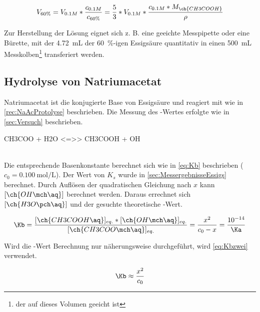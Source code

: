 \documentclass{article}
\begin{document}
         \begin{equation}
           V_{60\%} = V_{0.1 M} * \frac{c_{0.1 M}}{c_{60\%}} = \frac{5}{3} * V_{0.1 M} * \frac{c_{0.1 M} * M_{\ch{CH3COOH}}}{\rho} \label{eq:Volumen}
         \end{equation}
       
         Zur Herstellung der Lösung eignet sich z. B. eine geeichte Messpipette oder eine Bürette, mit der \SI[mode=text]{4.72}{\milli\liter} der \SI[mode=text]{60}{\percent}-igen Essigsäure quantitativ in einen \SI[mode=text]{500}{\milli\liter} Messkolben\footnote{der auf dieses Volumen geeicht ist} transferiert werden.
          
    \pagebreak
    
    \subsection{Hydrolyse von Natriumacetat} \label{sec:HydrolyseNatrium}
     
       Natriumacetat ist die konjugierte Base von Essigsäure und reagiert mit  wie in \ref{rec:NaAcProtolyse} beschrieben. Die Messung des \pH-Wertes erfolgte wie in \ref{sec:Versuch} beschrieben.
       
       \begin{reaction}
         CH3COO\mch\aq{} + H2O <=>> CH3COOH\aq{} + OH\mch\aq \label{rec:NaAcProtolyse} \\
       \end{reaction} \\
       
       Die entsprechende Basenkonstante \Kb berechnet sich wie in \eqref{eq:Kb} beschrieben ($c_{0} = \SI[mode=text]{0.100}{\mole\per\liter}$). Der Wert von $K_{s}$ wurde in \ref{sec:MessergebnisseEssigs} berechnet. Durch Auflösen der quadratischen Gleichung nach $x$ kann $[\ch{OH\mch\aq}]$ berechnet werden. Daraus errechnet sich $[\ch{H3O\pch\aq}]$ und der gesuchte theoretische \pH-Wert. 
       
       \begin{equation}
         \Kb = \frac{[\ch{CH3COOH\aq}]_{eq.} * [\ch{OH\mch\aq}]_{eq.}}{[\ch{CH3COO\mch\aq}]_{eq.}} = \frac{x^2}{c_{0}-x} = \frac{\num{e-14}}{\Ka} \label{eq:Kb}
       \end{equation}
       
       Wird die \pH-Wert Berechnung nur näherungsweise durchgeführt, wird \eqref{eq:Kbzwei} verwendet.
       
       \begin{equation}
         \Kb \approx \frac{x^2}{c_{0}} \label{eq:Kbzwei}
       \end{equation}
       
\end{document}
